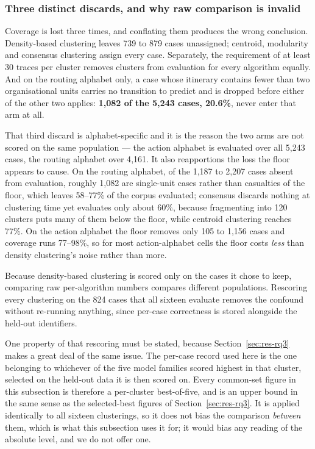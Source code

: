 \subsubsection{Three distinct discards, and why raw comparison is invalid}

Coverage is lost three times, and conflating them produces the wrong conclusion. Density-based
clustering leaves 739 to 879 cases unassigned; centroid, modularity and consensus clustering
assign every case. Separately, the requirement of at least 30 traces per cluster removes
clusters from evaluation for every algorithm equally. And on the routing alphabet only, a case
whose itinerary contains fewer than two organisational units carries no transition to predict
and is dropped before either of the other two applies: \textbf{1{,}082 of the 5{,}243 cases,
20.6\%}, never enter that arm at all.

That third discard is alphabet-specific and it is the reason the two arms are not scored on the
same population --- the action alphabet is evaluated over all 5{,}243 cases, the routing
alphabet over 4{,}161. It also reapportions the loss the floor appears to cause. On the routing
alphabet, of the 1{,}187 to 2{,}207 cases absent from evaluation, roughly 1{,}082 are
single-unit cases rather than casualties of the floor, which leaves 58--77\% of the corpus
evaluated; consensus discards nothing at clustering time yet evaluates only about 60\%, because
fragmenting into 120 clusters puts many of them below the floor, while centroid clustering
reaches 77\%. On the action alphabet the floor removes only 105 to 1{,}156 cases and coverage
runs 77--98\%, so for most action-alphabet cells the floor costs \emph{less} than density
clustering's noise rather than more.

Because density-based clustering is scored only on the cases it chose to keep, comparing raw
per-algorithm numbers compares different populations. Rescoring every clustering on the 824
cases that all sixteen evaluate removes the confound without re-running anything, since
per-case correctness is stored alongside the held-out identifiers.

One property of that rescoring must be stated, because Section~\ref{sec:res-rq3} makes a great
deal of the same issue. The per-case record used here is the one belonging to whichever of the
five model families scored highest in that cluster, selected on the held-out data it is then
scored on. Every common-set figure in this subsection is therefore a per-cluster best-of-five,
and is an upper bound in the same sense as the selected-best figures of
Section~\ref{sec:res-rq3}. It is applied identically to all sixteen clusterings, so it does not
bias the comparison \emph{between} them, which is what this subsection uses it for; it would
bias any reading of the absolute level, and we do not offer one.

